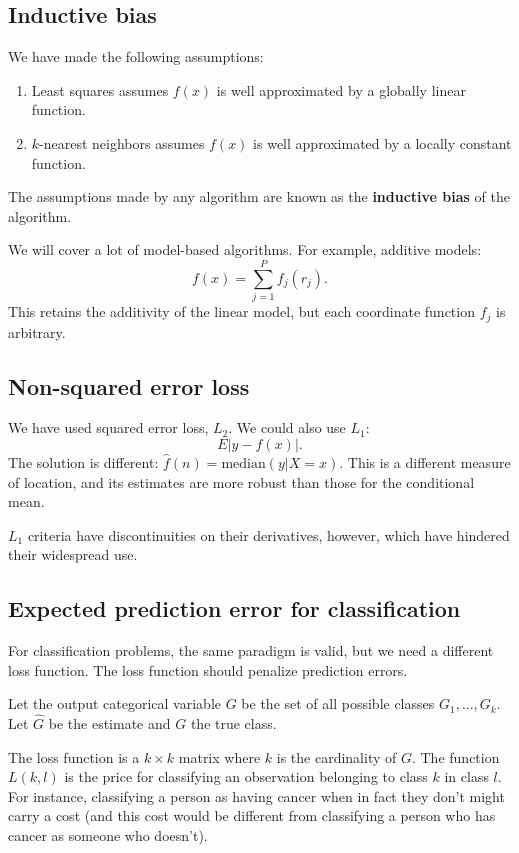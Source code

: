 \documentclass[a4paper,12pt]{article}
\begin{document}
\subsection{Inductive bias}
We have made the following assumptions: 
\begin{enumerate}
\item Least squares assumes $f(x)$ is well approximated by a globally linear function. 
\item $k$-nearest neighbors assumes $f(x)$ is well approximated by a locally constant function.
\end{enumerate}
The assumptions made by any algorithm are known as the \textbf{inductive bias} of the algorithm. 

We will cover a lot of model-based algorithms. For example, additive models: 
$$f(x) = \sum^P_{j=1} f_j(r_j).$$
This retains the additivity of the linear model, but each coordinate function $f_j$ is arbitrary. 

\subsection{Non-squared error loss}

We have used squared error loss, $L_2$. We could also use $L_1$: 
$$E|y-f(x)|.$$
The solution is different: $\hat f(n) = \text{median}(y|X=x)$. This is a different measure of location, and its estimates are more robust than those for the conditional mean. 

$L_1$ criteria have discontinuities on their derivatives, however, which have hindered their widespread use. 

\subsection{Expected prediction error for classification}

For classification problems, the same paradigm is valid, but we need a different loss function. The loss function should penalize prediction errors. 

Let the output categorical variable $G$ be the set of all possible classes $G_1, ..., G_k$. Let $\hat G$ be the estimate and $G$ the true class. 

The loss function is a $k\times k$ matrix where $k$ is the cardinality of $G$. The function $L(k, l)$ is the price for classifying an observation belonging to class $k$ in class $l$. For instance, classifying a person as having cancer when in fact they don't might carry a cost (and this cost would be different from classifying a person who has cancer as someone who doesn't). 
\end{document}
